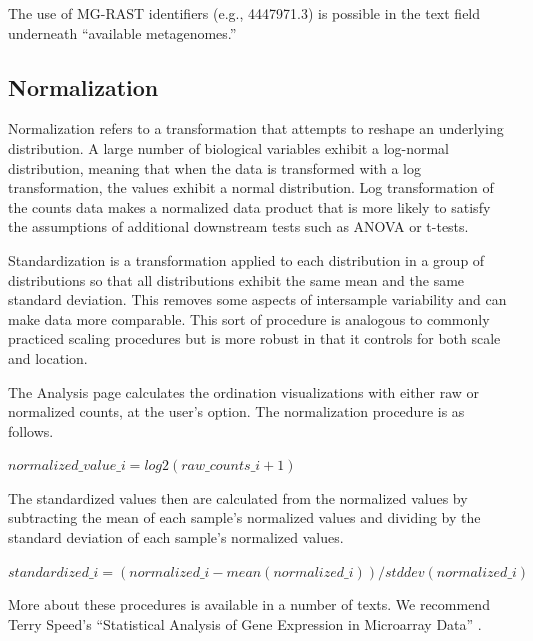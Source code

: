 \documentclass[12pt,fullpage]{report}
\begin{document}
The use of MG-RAST identifiers (e.g., 4447971.3) is possible in the text field underneath ``available metagenomes.''




\subsection{Normalization}

Normalization refers to a transformation that attempts to reshape an underlying distribution. A large number of biological variables exhibit a log-normal distribution, meaning that when the data is transformed with a log transformation, the values exhibit a normal distribution. Log transformation of the counts data makes a normalized data product that is more likely to satisfy the assumptions  of additional downstream tests such as ANOVA or t-tests.

Standardization is a transformation applied to each distribution in a group of distributions so that all distributions exhibit the same mean and the same standard deviation. This removes some aspects of intersample variability and can make data more comparable. This sort of procedure is analogous to commonly practiced scaling procedures but is more robust in that it controls for both scale and location.

The Analysis page calculates the ordination visualizations with either raw or normalized counts, at the user’s option. The normalization procedure is
as follows.

\begin{small}
\begin{math}
normalized\_value\_i = log2(raw\_counts\_i + 1)
\end{math}
\end{small}

\noindent
The standardized values then are calculated from the normalized values by subtracting the mean of each sample’s normalized values and dividing by the standard deviation of each sample’s normalized values.

\begin{small}
\begin{math}
standardized\_i = (normalized\_i - mean({normalized\_i})) / stddev({normalized\_i})
\end{math}
\end{small}

More about these procedures is available in a number of texts. We recommend Terry Speed’s “Statistical Analysis of Gene Expression in Microarray Data” \cite{1584883278}.
\end{document}
